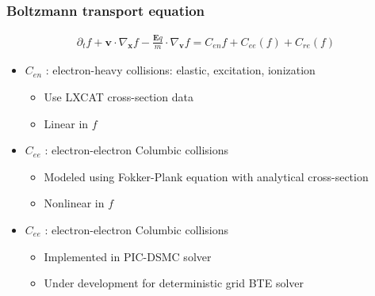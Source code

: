 \documentclass[mathserif, aspectratio=169]{beamer}
\newcommand{\vect}[1]{\boldsymbol{#1}}
\newcommand{\myint}{\int\limits}
\newcommand{\diff}[1]{\, d#1}
\begin{document}
\begin{frame}
	\frametitle{Boltzmann transport equation}
	\begin{align}
		\partial_t f  + \vect{v} \cdot \nabla_{\vect{x}} f -\frac{\vect{E} q}{m} \cdot \nabla_{\vect{v }}f = C_{en}f + C_{ee}(f) + C_{re}(f)
	\end{align}
	\begin{itemize}
		\item $C_{en}$ : electron-heavy collisions: elastic, excitation, ionization
		\begin{itemize}
			\item Use LXCAT cross-section data 
			\item Linear in $f$
		\end{itemize} 
		\item $C_{ee}$ : electron-electron Columbic collisions 
		\begin{itemize}
			\item Modeled using Fokker-Plank equation with analytical cross-section
			\item Nonlinear in $f$
		\end{itemize}
		\item $C_{ee}$ : electron-electron Columbic collisions 
		\begin{itemize}
			\item Implemented in PIC-DSMC solver
			\item Under development for deterministic grid BTE solver
		\end{itemize}
	\end{itemize}
\end{frame}
\end{document}
